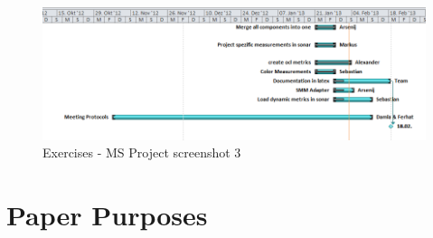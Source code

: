 \newpage

\begin{figure}[htb]
\begin{center}
\includegraphics[width=\textwidth]{msp_part3}
\caption{Exercises - MS Project screenshot 3}
\end{center}
\end{figure}

\section{Paper Purposes}
